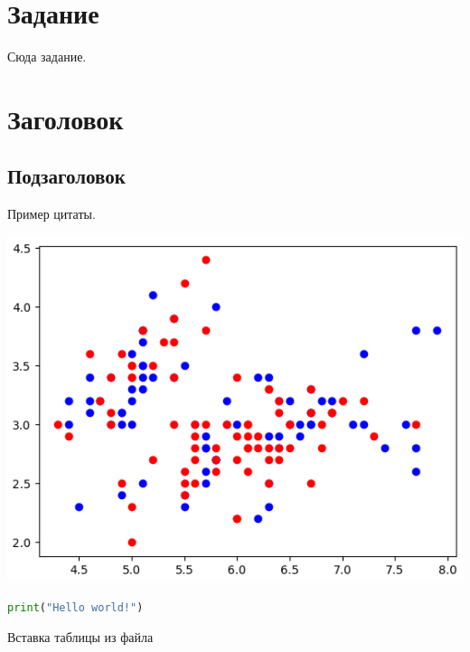 \documentclass[a4paper, 12pt]{article}
\begin{document}

\pagebreak
\tableofcontents
\newpage
\section*{Задание}
Сюда задание.

\newpage
\section{Заголовок}
\subsection{Подзаголовок}
Пример цитаты.\cite{ALT}
\begin{center}
    \centering
    \includegraphics[width=.7\linewidth]{extras/output.png}
    \label{fig:prplot}
\end{center}
\begin{lstlisting}[language=Python, caption=листинг]
    print("Hello world!")
\end{lstlisting}



\begin{table}
    \centering
\caption{Вставка таблицы из файла}
\end{table}
\newpage

\end{document}
